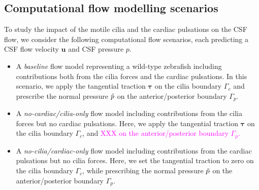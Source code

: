 \documentclass[fleqn]{wlscirep}
\newcommand{\Gc}{\Gamma_{c}}
\newcommand{\Gp}{\Gamma_{p}}
\newcommand{\uu}{\mathbf{u}}
\newcommand{\btau}{\bm{\tau}}
\newcommand{\mer}[1]{\textcolor{magenta}{#1}}
\begin{document}
\subsection*{Computational flow modelling scenarios}
To study the impact of the motile cilia and the cardiac pulsations on the CSF flow, we consider the following computational flow scenarios, each predicting a CSF flow velocity $\uu$ and CSF pressure $p$.
\begin{itemize}
    \item A \emph{baseline} flow model representing a wild-type zebrafish including contributions both from the cilia forces and the cardiac pulsations. In this scenario, we apply the tangential traction $\btau$ on the cilia boundary $\Gc$ and prescribe the normal pressure $\Tilde{p}$ on the anterior/posterior boundary $\Gp$. %

    \item A \emph{no-cardiac/cilia-only} flow model including contributions from the cilia forces but no cardiac pulsations. Here, we apply the tangential traction $\btau$ on the cilia boundary $\Gc$, and \mer{XXX on the anterior/posterior boundary $\Gp$.} %

    \item A \emph{no-cilia/cardiac-only} flow model including contributions from the cardiac pulsations but no cilia forces. Here, we set the tangential traction to zero on the cilia boundary $\Gc$, while prescribing the normal pressure $\Tilde{p}$ on the anterior/posterior boundary $\Gp$.  %

\end{itemize}
\end{document}
